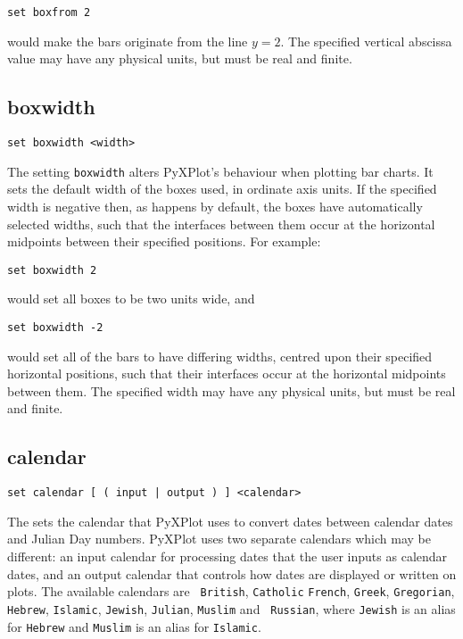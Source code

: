 \begin{verbatim}
set boxfrom 2
\end{verbatim}

\noindent would make the bars originate from the line $y=2$. The specified
vertical abscissa value may have any physical units, but must be real and
finite.



\subsection{boxwidth}

\begin{verbatim}
set boxwidth <width>
\end{verbatim}

The setting {\tt boxwidth} alters PyXPlot's behaviour when plotting bar charts.
It sets the default width of the boxes used, in ordinate axis units.  If the
specified width is negative then, as happens by default, the boxes have
automatically selected widths, such that the interfaces between them occur at
the horizontal midpoints between their specified positions.  For example:

\begin{verbatim}
set boxwidth 2
\end{verbatim}

\noindent would set all boxes to be two units wide, and

\begin{verbatim}
set boxwidth -2
\end{verbatim}

\noindent would set all of the bars to have differing widths, centred upon
their specified horizontal positions, such that their interfaces occur at the
horizontal midpoints between them. The specified width may have any physical
units, but must be real and finite.


\subsection{calendar}

\begin{verbatim}
set calendar [ ( input | output ) ] <calendar>
\end{verbatim}

The  sets the calendar that PyXPlot uses to convert dates
between calendar dates and Julian Day numbers. PyXPlot uses two separate
calendars which may be different: an input calendar for processing dates that
the user inputs as calendar dates, and an output calendar that controls how
dates are displayed or written on plots.  The available calendars are {\tt
British}, {\tt Catholic} {\tt French}, {\tt Greek}, {\tt Gregorian}, {\tt
Hebrew}, {\tt Islamic}, {\tt Jewish}, {\tt Julian}, {\tt Muslim} and {\tt
Russian}, where {\tt Jewish} is an alias for {\tt Hebrew} and {\tt Muslim} is
an alias for {\tt Islamic}.

